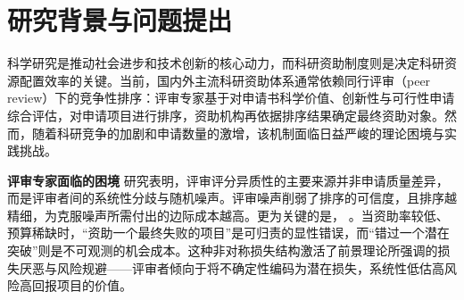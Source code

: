 

\section{\textbf{研究背景与问题提出}}

科学研究是推动社会进步和技术创新的核心动力，而科研资助制度则是决定科研资源配置效率的关键。当前，国内外主流科研资助体系通常依赖同行评审（peer review）下的竞争性排序：评审专家基于对申请书科学价值、创新性与可行性申请综合评估，对申请项目进行排序，资助机构再依据排序结果确定最终资助对象。然而，随着科研竞争的加剧和申请数量的激增，该机制面临日益严峻的理论困境与实践挑战。



\textbf{评审专家面临的困境} \quad {}研究表明，评审评分异质性的主要来源并非申请质量差异，而是评审者间的系统性分歧与随机噪声\citep{kahnemanNoiseFlawHuman2021, galloInfluencePeerReviewer2016, pierLowAgreementReviewers2018}。评审噪声削弱了排序的可信度，且排序越精细，为克服噪声所需付出的边际成本越高。更为关键的是， \citep{fangResearchFundingCase2016, franzoniUncertaintyRisktakingScience2023}。当资助率较低、预算稀缺时，“资助一个最终失败的项目”是可归责的显性错误，而“错过一个潜在突破”则是不可观测的机会成本。这种非对称损失结构激活了前景理论\citep{Tversky1992}所强调的损失厌恶与风险规避——评审者倾向于将不确定性编码为潜在损失，系统性低估高风险高回报项目的价值。

